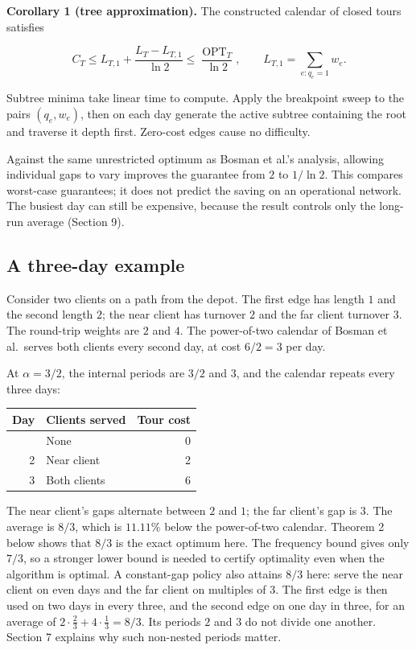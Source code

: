 \documentclass[
  british,
  11pt,
  a4paper,
]{article}
\newcounter{none} %
\begin{document}
\textbf{Corollary 1 (tree approximation).} The constructed calendar of
closed tours satisfies

\[
C_T\le L_{T,1}+\frac{L_T-L_{T,1}}{\ln2}
\le\frac{\operatorname{OPT}_T}{\ln2},\qquad
L_{T,1}=\sum_{e:q_e=1}w_e. \tag{18}
\]

Subtree minima take linear time to compute. Apply the breakpoint sweep
to the pairs \((q_e,w_e)\), then on each day generate the active subtree
containing the root and traverse it depth first. Zero-cost edges cause
no difficulty.

Against the same unrestricted optimum as Bosman et al.'s analysis,
allowing individual gaps to vary improves the guarantee from \(2\) to
\(1/\ln2\). This compares worst-case guarantees; it does not predict the
saving on an operational network. The busiest day can still be
expensive, because the result controls only the long-run average
(Section 9).

\subsection{A three-day example}\label{a-three-day-example}

Consider two clients on a path from the depot. The first edge has length
\(1\) and the second length \(2\); the near client has turnover \(2\)
and the far client turnover \(3\). The round-trip weights are \(2\) and
\(4\). The power-of-two calendar of Bosman et al.~serves both clients
every second day, at cost \(6/2=3\) per day.

At \(\alpha=3/2\), the internal periods are \(3/2\) and \(3\), and the
calendar repeats every three days:


{\def\LTcaptype{none} %
\begin{longtable}[]{@{}rlr@{}}
\toprule\noalign{}
Day & Clients served & Tour cost \\
\midrule\noalign{}
\endhead
\bottomrule\noalign{}
\endlastfoot
1 & None & 0 \\
2 & Near client & 2 \\
3 & Both clients & 6 \\
\end{longtable}
}

The near client's gaps alternate between \(2\) and \(1\); the far
client's gap is \(3\). The average is \(8/3\), which is \(11.11\%\)
below the power-of-two calendar. Theorem 2 below shows that \(8/3\) is
the exact optimum here. The frequency bound gives only \(7/3\), so a
stronger lower bound is needed to certify optimality even when the
algorithm is optimal. A constant-gap policy also attains \(8/3\) here:
serve the near client on even days and the far client on multiples of
\(3\). The first edge is then used on two days in every three, and the
second edge on one day in three, for an average of
\(2\cdot\frac23+4\cdot\frac13=8/3\). Its periods \(2\) and \(3\) do not
divide one another. Section 7 explains why such non-nested periods
matter.
\end{document}
